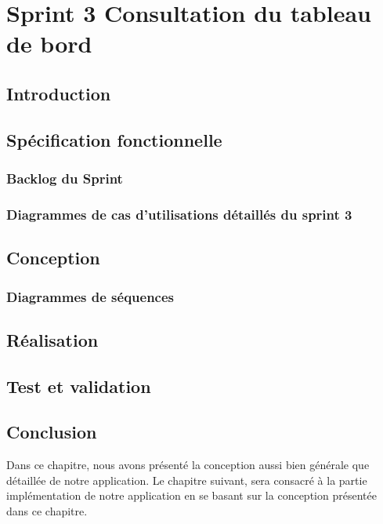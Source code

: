 \chapter{Sprint 3 Consultation du tableau de bord}

\section*{Introduction}
\section{Spécification fonctionnelle}
\subsection{Backlog du Sprint}
\subsection{Diagrammes de cas d’utilisations détaillés du sprint 3}
\section{Conception}
\subsection{Diagrammes de séquences}
\section{Réalisation}
\section{Test et validation}

   
   
\section*{Conclusion}
  Dans ce chapitre, nous avons présenté la conception aussi bien générale que détaillée de notre application. Le chapitre suivant, sera consacré à la partie implémentation de notre application en se basant sur la conception présentée dans ce chapitre.